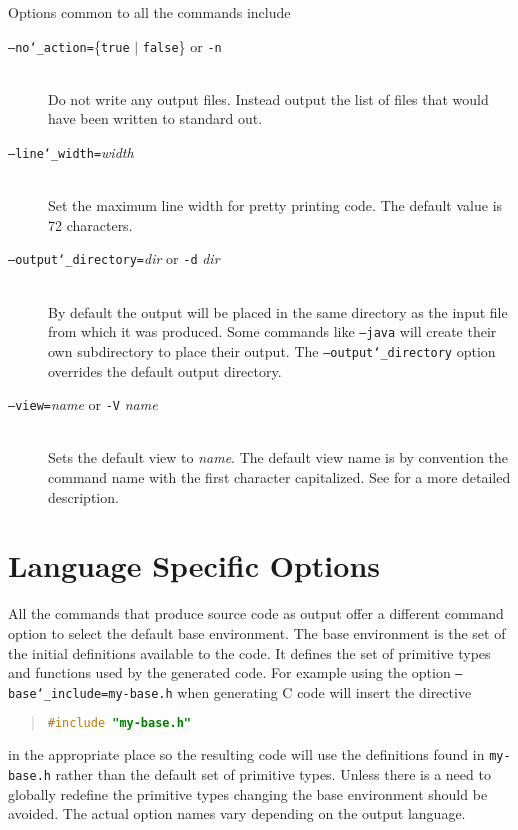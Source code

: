 Options common to all the commands include
\begin{description}
  \item[\normalfont\texttt{--no\char`\_action=}\{\texttt{true} $|$ \texttt{false}\} or \texttt{-n}] \mbox{}\\
      Do not write any output files. Instead output the list of files that would
      have been written to standard out.
  \item[\normalfont\texttt{--line\char`\_width=}\textit{width}] \mbox{}\\
    Set the maximum line width for pretty printing code. The default value
    is 72 characters.
  \item[\normalfont\texttt{--output\char`\_directory=}\textit{dir} or \texttt{-d} \textit{dir}] \mbox{}\\
    By default the output will be placed in the same directory as the
    input file from which it was produced.
    Some commands like \texttt{--java} will create their own subdirectory to
    place their output.
    The \texttt{--output\char`\_directory} option overrides the default output directory.
  \item[\normalfont\texttt{--view=}\textit{name} or \texttt{-V} \textit{name}] \mbox{}\\
    Sets the default view to \textit{name}. The default view name is by convention
    the command name with the first character capitalized. See 
    for a more detailed description.  
\end{description}%

\section{Language Specific Options}
\label{sec:language-specific-options}

All the commands that produce source code as output offer a different
command option to select the default base environment.
The base environment is the set of the initial definitions available to the code.
It defines the set of primitive types and functions used by the generated code.
For example using the option \texttt{--base\char`\_include=my-base.h}
when generating C code will insert the directive
\begin{quote}\begin{lstlisting}[language=c]
#include "my-base.h"
\end{lstlisting}\end{quote}%
in the appropriate place so the resulting code will use the definitions found in
\texttt{my-base.h} rather than the default set of primitive types.
Unless there is a need to globally redefine
the primitive types changing the base environment should be avoided.
The actual option names vary depending on the output language.

